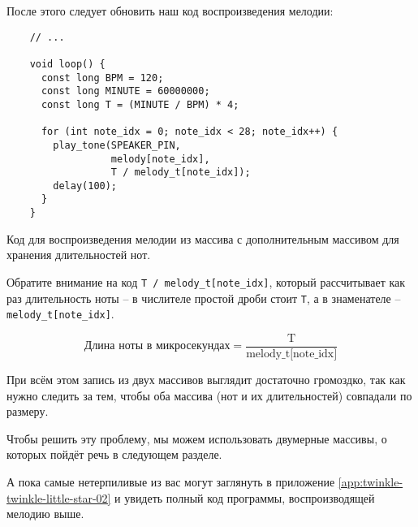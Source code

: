 \documentclass[../sparc.tex]{subfiles}
\begin{document}
После этого следует обновить наш код воспроизведения мелодии:

\begin{listing}[H]
  \begin{verbatim}
    // ...

    void loop() {
      const long BPM = 120;
      const long MINUTE = 60000000;
      const long T = (MINUTE / BPM) * 4;

      for (int note_idx = 0; note_idx < 28; note_idx++) {
        play_tone(SPEAKER_PIN,
                  melody[note_idx],
                  T / melody_t[note_idx]);
        delay(100);
      }
    }
  \end{verbatim}
  \label{listing:music-array-example-5}
  \caption{Код для воспроизведения мелодии из массива с дополнительным массивом
    для хранения длительностей нот.}
\end{listing}

Обратите внимание на код \texttt{T / melody\_t[note\_idx]}, который рассчитывает
как раз длительность ноты -- в числителе простой дроби стоит \texttt{T}, а в
знаменателе -- \texttt{melody\_t[note\_idx]}.

\begin{equation}
  \mbox{Длина ноты в микросекундах} = \frac{\mbox{T}}{\mbox{melody\_t[note\_idx]}}
\end{equation}

При всём этом запись из двух массивов выглядит достаточно громоздко, так как
нужно следить за тем, чтобы оба массива (нот и их длительностей) совпадали по
размеру.

Чтобы решить эту проблему, мы можем использовать двумерные массивы, о которых
пойдёт речь в следующем разделе.

А пока самые нетерпиливые из вас могут заглянуть в приложение
\ref{app:twinkle-twinkle-little-star-02} и увидеть полный код программы,
воспроизводящей мелодию выше.
\end{document}

